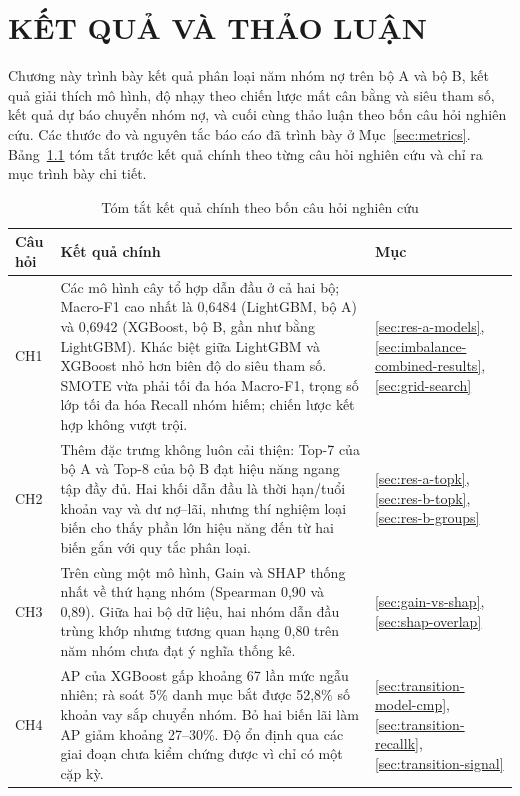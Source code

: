 \chapter{KẾT QUẢ VÀ THẢO LUẬN}

Chương này trình bày kết quả phân loại năm nhóm nợ trên bộ A và bộ B, kết quả giải thích mô hình, độ nhạy theo chiến lược mất cân bằng và siêu tham số, kết quả dự báo chuyển nhóm nợ, và cuối cùng thảo luận theo bốn câu hỏi nghiên cứu. Các thước đo và nguyên tắc báo cáo đã trình bày ở Mục~\ref{sec:metrics}. Bảng~\ref{tab:ch3-roadmap} tóm tắt trước kết quả chính theo từng câu hỏi nghiên cứu và chỉ ra mục trình bày chi tiết.

\begin{table}[H]
\centering
\caption{Tóm tắt kết quả chính theo bốn câu hỏi nghiên cứu}
\label{tab:ch3-roadmap}
\begin{tabular}{|p{1.1cm}|p{8.6cm}|p{3.0cm}|}
\hline
\textbf{Câu hỏi} & \textbf{Kết quả chính} & \textbf{Mục}\\
\hline
CH1 & Các mô hình cây tổ hợp dẫn đầu ở cả hai bộ; Macro-F1 cao nhất là 0,6484 (LightGBM, bộ A) và 0,6942 (XGBoost, bộ B, gần như bằng LightGBM). Khác biệt giữa LightGBM và XGBoost nhỏ hơn biên độ do siêu tham số. SMOTE vừa phải tối đa hóa Macro-F1, trọng số lớp tối đa hóa Recall nhóm hiếm; chiến lược kết hợp không vượt trội. & \ref{sec:res-a-models}, \ref{sec:imbalance-combined-results}, \ref{sec:grid-search}\\
\hline
CH2 & Thêm đặc trưng không luôn cải thiện: Top-7 của bộ A và Top-8 của bộ B đạt hiệu năng ngang tập đầy đủ. Hai khối dẫn đầu là thời hạn/tuổi khoản vay và dư nợ--lãi, nhưng thí nghiệm loại biến cho thấy phần lớn hiệu năng đến từ hai biến gắn với quy tắc phân loại. & \ref{sec:res-a-topk}, \ref{sec:res-b-topk}, \ref{sec:res-b-groups}\\
\hline
CH3 & Trên cùng một mô hình, Gain và SHAP thống nhất về thứ hạng nhóm (Spearman 0,90 và 0,89). Giữa hai bộ dữ liệu, hai nhóm dẫn đầu trùng khớp nhưng tương quan hạng 0,80 trên năm nhóm chưa đạt ý nghĩa thống kê. & \ref{sec:gain-vs-shap}, \ref{sec:shap-overlap}\\
\hline
CH4 & AP của XGBoost gấp khoảng 67 lần mức ngẫu nhiên; rà soát 5\% danh mục bắt được 52,8\% số khoản vay sắp chuyển nhóm. Bỏ hai biến lãi làm AP giảm khoảng 27--30\%. Độ ổn định qua các giai đoạn chưa kiểm chứng được vì chỉ có một cặp kỳ. & \ref{sec:transition-model-cmp}, \ref{sec:transition-recallk}, \ref{sec:transition-signal}\\
\hline
\end{tabular}
\end{table}

